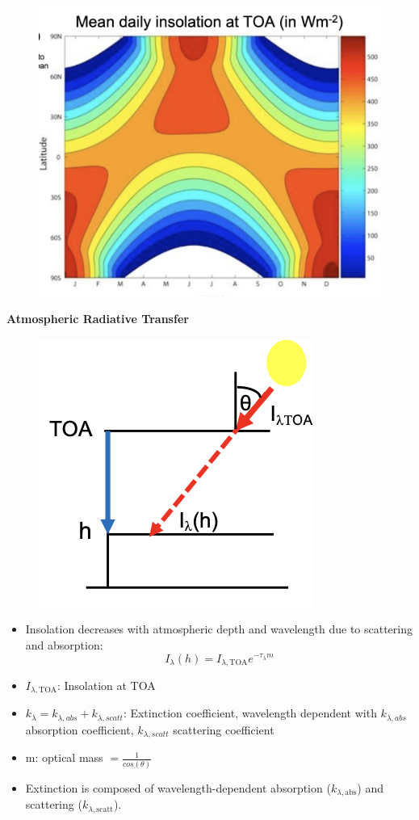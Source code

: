 \documentclass[fontsize=8pt, a4paper, landscape, fleqn]{scrartcl}
\renewcommand{\subsection}[1]{%
    \noindent\colorbox{subsectioncolor}{%
        \parbox{\dimexpr\columnwidth-2\fboxsep}{\color{white}\textbf{#1}}}%
    \vspace{0.5mm}%
}
\begin{document}
\begin{multicols*}{3}[\raggedcolumns]
\begin{figure}[H]
    \centering
    \includegraphics[width=0.5\linewidth]{CS//img/Mean_daily_isolation.58.png}
\end{figure}
\subsection{Atmospheric Radiative Transfer}
\begin{figure}[H]
    \centering
    \includegraphics[width=0.2\linewidth]{CS//img/Attenuation.png}
\end{figure}
\begin{itemize}
    \item Insolation decreases with atmospheric depth and wavelength due to scattering and absorption:
    \[
    I_\lambda(h) = I_{\lambda,\mathrm{TOA}} e^{-\tau_\lambda m}
    \]
    \item $I_{\lambda,\mathrm{TOA}}$: Insolation at TOA
    \item $k_\lambda = k_{\lambda,abs}+k_{\lambda,scatt}$: Extinction coefficient, wavelength dependent with $k_{\lambda,abs}$ absorption coefficient, $k_{\lambda,scatt}$ scattering coefficient
    \item m: optical mass $= \frac{1}{cos(\theta)}$
    \item Extinction is composed of wavelength-dependent absorption ($k_{\lambda,\mathrm{abs}}$) and scattering ($k_{\lambda,\mathrm{scatt}}$).
\end{itemize}


\end{multicols*}
\end{document}
